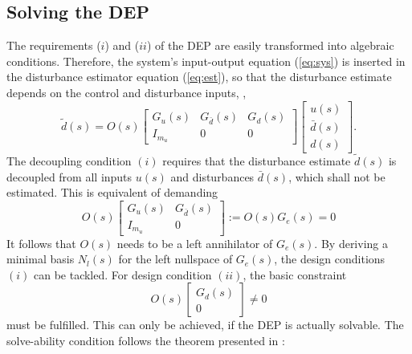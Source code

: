 \documentclass[graybox]{svmult}
\begin{document}
\subsection{Solving the DEP}
The requirements ($i$) and ($ii$) of the DEP are easily transformed into  algebraic conditions. Therefore, the system's input-output equation (\ref{eq:sys}) is inserted in the disturbance estimator equation (\ref{eq:est}), so that the disturbance estimate depends on the control and disturbance inputs, \ie,
\begin{equation}\label{eq:full}
	\tilde d(s) = O(s) 
	\begin{bmatrix}
		G_u(s) & G_{\bar d}(s) & G_d(s) \\ I_{m_u}& 0 & 0
	\end{bmatrix}
	\begin{bmatrix}
		u(s) \\ \bar d(s) \\ d(s)
	\end{bmatrix}.
\end{equation}
The decoupling condition $(i)$ requires that the disturbance estimate $\tilde d(s)$ is decoupled from all inputs $u(s)$ and disturbances $\bar d(s)$, which shall not be estimated. This is equivalent of demanding 
\begin{equation}\label{eq:nr}
	O(s) 
	\begin{bmatrix}
		G_u(s) & G_{\bar d}(s)  \\ I_{m_u}& 0
	\end{bmatrix}
	:= O(s) G_e(s) =  0
\end{equation}
It follows that $O(s)$ needs to be a left annihilator of $G_e(s)$. 
By deriving a minimal basis $N_l(s)$ for the left nullspace of $G_e(s)$,  the design conditions $(i)$ can be tackled. 
For design condition $(ii)$, the basic constraint
\begin{equation}\label{eq:con}
	O(s) 
	\begin{bmatrix}
		G_{d}(s)  \\  0
	\end{bmatrix}
	\neq  0
\end{equation}
must be fulfilled. This can only be achieved, if the DEP is actually solvable. The solve-ability condition follows the theorem presented in \cite{Var09}:
\end{document}
